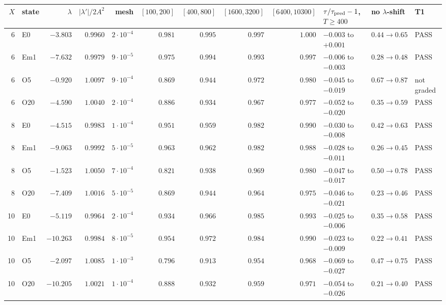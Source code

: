 \begin{tabular}{rlrrrrrrrlll}
\toprule
$X$ & state & $\lambda$ & $|\lambda'|/2A^2$ & mesh & $[100,200]$ & $[400,800]$ & $[1600,3200]$ & $[6400,10300]$ & $\tau/\tau_{\rm pred}-1$, $T\ge400$ & no $\lambda$-shift & T1 \\
\midrule
6 & E0 & $-3.803$ & $0.9960$ & $2\cdot10^{-4}$ & $0.981$ & $0.995$ & $0.997$ & $1.000$ & $-0.003$ to $+0.001$ & $0.44\to0.65$ & PASS \\
6 & Em1 & $-7.632$ & $0.9979$ & $9\cdot10^{-5}$ & $0.975$ & $0.994$ & $0.993$ & $0.997$ & $-0.006$ to $-0.003$ & $0.28\to0.48$ & PASS \\
6 & O5 & $-0.920$ & $1.0097$ & $9\cdot10^{-4}$ & $0.869$ & $0.944$ & $0.972$ & $0.980$ & $-0.045$ to $-0.019$ & $0.67\to0.87$ & not graded \\
6 & O20 & $-4.590$ & $1.0040$ & $2\cdot10^{-4}$ & $0.886$ & $0.934$ & $0.967$ & $0.977$ & $-0.052$ to $-0.020$ & $0.35\to0.59$ & PASS \\
8 & E0 & $-4.515$ & $0.9983$ & $1\cdot10^{-4}$ & $0.951$ & $0.959$ & $0.982$ & $0.990$ & $-0.030$ to $-0.008$ & $0.42\to0.63$ & PASS \\
8 & Em1 & $-9.063$ & $0.9992$ & $5\cdot10^{-5}$ & $0.963$ & $0.962$ & $0.982$ & $0.988$ & $-0.028$ to $-0.011$ & $0.26\to0.45$ & PASS \\
8 & O5 & $-1.523$ & $1.0050$ & $7\cdot10^{-4}$ & $0.821$ & $0.938$ & $0.969$ & $0.980$ & $-0.047$ to $-0.017$ & $0.50\to0.78$ & PASS \\
8 & O20 & $-7.409$ & $1.0016$ & $5\cdot10^{-5}$ & $0.869$ & $0.944$ & $0.964$ & $0.975$ & $-0.046$ to $-0.021$ & $0.23\to0.46$ & PASS \\
10 & E0 & $-5.119$ & $0.9964$ & $2\cdot10^{-4}$ & $0.934$ & $0.966$ & $0.985$ & $0.993$ & $-0.025$ to $-0.006$ & $0.35\to0.58$ & PASS \\
10 & Em1 & $-10.263$ & $0.9984$ & $8\cdot10^{-5}$ & $0.954$ & $0.972$ & $0.984$ & $0.990$ & $-0.023$ to $-0.009$ & $0.22\to0.41$ & PASS \\
10 & O5 & $-2.097$ & $1.0085$ & $1\cdot10^{-3}$ & $0.796$ & $0.913$ & $0.954$ & $0.968$ & $-0.069$ to $-0.027$ & $0.47\to0.75$ & PASS \\
10 & O20 & $-10.205$ & $1.0021$ & $1\cdot10^{-4}$ & $0.888$ & $0.932$ & $0.959$ & $0.971$ & $-0.054$ to $-0.026$ & $0.21\to0.40$ & PASS \\
\bottomrule
\end{tabular}
